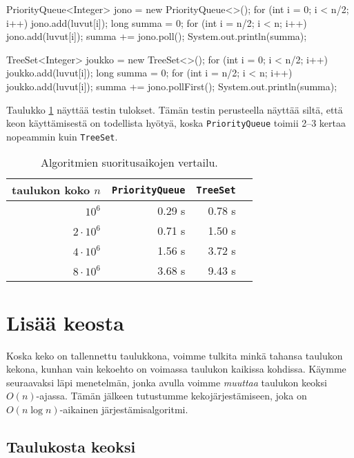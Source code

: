 \begin{code}
PriorityQueue<Integer> jono = new PriorityQueue<>();
for (int i = 0; i < n/2; i++) {
    jono.add(luvut[i]);
}
long summa = 0;
for (int i = n/2; i < n; i++) {
    jono.add(luvut[i]);
    summa += jono.poll();
}
System.out.println(summa);
\end{code}

\begin{code}
TreeSet<Integer> joukko = new TreeSet<>();
for (int i = 0; i < n/2; i++) {
    joukko.add(luvut[i]);
}
long summa = 0;
for (int i = n/2; i < n; i++) {
    joukko.add(luvut[i]);
    summa += jono.pollFirst();
}
System.out.println(summa);
\end{code}

Taulukko \ref{tab:kekver} näyttää testin tulokset.
Tämän testin perusteella näyttää siltä,
että keon käyttämisestä on todellista hyötyä,
koska \texttt{PriorityQueue} toimii 2–3
kertaa nopeammin kuin \texttt{TreeSet}.

\begin{table}
\center
\begin{tabular}{rrrr}
taulukon koko $n$ & \texttt{PriorityQueue} & \texttt{TreeSet} \\
\hline
$10^6$ & 0.29 s & 0.78 s \\
$2 \cdot 10^6$ & 0.71 s & 1.50 s \\
$4 \cdot 10^6$ & 1.56 s & 3.72 s \\
$8 \cdot 10^6$ & 3.68 s & 9.43 s \\
\end{tabular}
\caption{Algoritmien suoritusaikojen vertailu.}
\label{tab:kekver}
\end{table}

\section{Lisää keosta}

Koska keko on tallennettu taulukkona,
voimme tulkita minkä tahansa taulukon kekona,
kunhan vain kekoehto on voimassa taulukon kaikissa kohdissa.
Käymme seuraavaksi läpi menetelmän, jonka avulla voimme
\emph{muuttaa} taulukon keoksi $O(n)$-ajassa.
Tämän jälkeen tutustumme kekojärjestämiseen,
joka on $O(n \log n)$-aikainen järjestämisalgoritmi.

\subsection{Taulukosta keoksi}

